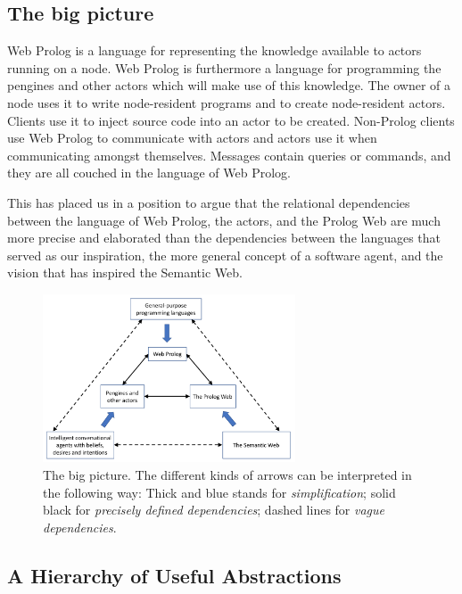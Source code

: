 \documentclass{tlp}
\begin{document}
\subsection{The big picture}

\noindent Web Prolog is a language for representing the knowledge available to actors running on a node. Web Prolog is furthermore a language for programming the pengines and other actors which will make use of this knowledge. The owner of a node uses it to write node-resident programs and to create node-resident actors. Clients use it to inject source code into an actor to be created. Non-Prolog clients use Web Prolog to communicate with actors and actors use it when communicating amongst themselves. Messages contain queries or commands, and they are all couched in the language of Web Prolog.

This has placed us in a position to argue that the relational dependencies between the language of Web Prolog, the actors, and the Prolog Web are much more precise and elaborated than the dependencies between the languages that served as our inspiration, the more general concept of a software agent, and the vision that has inspired the Semantic Web.

\begin{figure}[h]
    \centering
	\includegraphics[width=7.5cm]{big-picture.png}
    \caption{The big picture. The different kinds of arrows can be interpreted in the following way: Thick and blue stands for \textit{simplification}; solid black for \textit{precisely defined dependencies}; dashed lines for \textit{vague dependencies}.}
    \label{fig:whole}
\end{figure}


\subsection{A Hierarchy of Useful Abstractions}\label{sec:hierarchy-of-abstraction}
\end{document}
